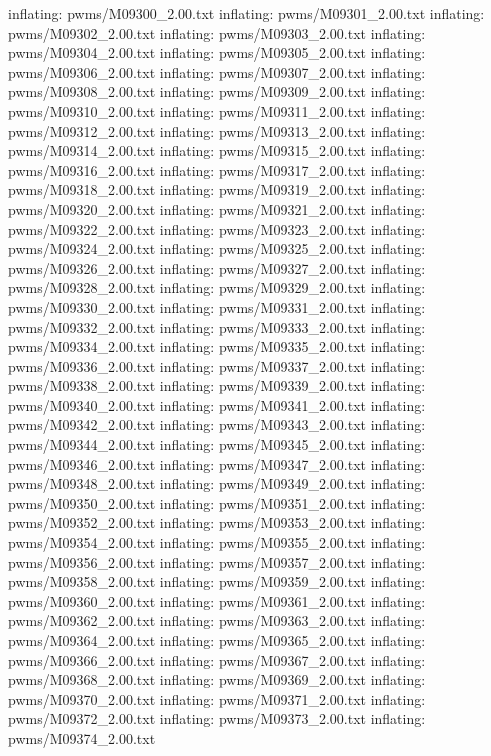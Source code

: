 \documentclass[letterpaper,10pt,english]{sphinxmanual}
\begin{document}
{\begin{sphinxVerbatim}[commandchars=\\\{\}]
  inflating: pwms/M09300\_2.00.txt
  inflating: pwms/M09301\_2.00.txt
  inflating: pwms/M09302\_2.00.txt
  inflating: pwms/M09303\_2.00.txt
  inflating: pwms/M09304\_2.00.txt
  inflating: pwms/M09305\_2.00.txt
  inflating: pwms/M09306\_2.00.txt
  inflating: pwms/M09307\_2.00.txt
  inflating: pwms/M09308\_2.00.txt
  inflating: pwms/M09309\_2.00.txt
  inflating: pwms/M09310\_2.00.txt
  inflating: pwms/M09311\_2.00.txt
  inflating: pwms/M09312\_2.00.txt
  inflating: pwms/M09313\_2.00.txt
  inflating: pwms/M09314\_2.00.txt
  inflating: pwms/M09315\_2.00.txt
  inflating: pwms/M09316\_2.00.txt
  inflating: pwms/M09317\_2.00.txt
  inflating: pwms/M09318\_2.00.txt
  inflating: pwms/M09319\_2.00.txt
  inflating: pwms/M09320\_2.00.txt
  inflating: pwms/M09321\_2.00.txt
  inflating: pwms/M09322\_2.00.txt
  inflating: pwms/M09323\_2.00.txt
  inflating: pwms/M09324\_2.00.txt
  inflating: pwms/M09325\_2.00.txt
  inflating: pwms/M09326\_2.00.txt
  inflating: pwms/M09327\_2.00.txt
  inflating: pwms/M09328\_2.00.txt
  inflating: pwms/M09329\_2.00.txt
  inflating: pwms/M09330\_2.00.txt
  inflating: pwms/M09331\_2.00.txt
  inflating: pwms/M09332\_2.00.txt
  inflating: pwms/M09333\_2.00.txt
  inflating: pwms/M09334\_2.00.txt
  inflating: pwms/M09335\_2.00.txt
  inflating: pwms/M09336\_2.00.txt
  inflating: pwms/M09337\_2.00.txt
  inflating: pwms/M09338\_2.00.txt
  inflating: pwms/M09339\_2.00.txt
  inflating: pwms/M09340\_2.00.txt
  inflating: pwms/M09341\_2.00.txt
  inflating: pwms/M09342\_2.00.txt
  inflating: pwms/M09343\_2.00.txt
  inflating: pwms/M09344\_2.00.txt
  inflating: pwms/M09345\_2.00.txt
  inflating: pwms/M09346\_2.00.txt
  inflating: pwms/M09347\_2.00.txt
  inflating: pwms/M09348\_2.00.txt
  inflating: pwms/M09349\_2.00.txt
  inflating: pwms/M09350\_2.00.txt
  inflating: pwms/M09351\_2.00.txt
  inflating: pwms/M09352\_2.00.txt
  inflating: pwms/M09353\_2.00.txt
  inflating: pwms/M09354\_2.00.txt
  inflating: pwms/M09355\_2.00.txt
  inflating: pwms/M09356\_2.00.txt
  inflating: pwms/M09357\_2.00.txt
  inflating: pwms/M09358\_2.00.txt
  inflating: pwms/M09359\_2.00.txt
  inflating: pwms/M09360\_2.00.txt
  inflating: pwms/M09361\_2.00.txt
  inflating: pwms/M09362\_2.00.txt
  inflating: pwms/M09363\_2.00.txt
  inflating: pwms/M09364\_2.00.txt
  inflating: pwms/M09365\_2.00.txt
  inflating: pwms/M09366\_2.00.txt
  inflating: pwms/M09367\_2.00.txt
  inflating: pwms/M09368\_2.00.txt
  inflating: pwms/M09369\_2.00.txt
  inflating: pwms/M09370\_2.00.txt
  inflating: pwms/M09371\_2.00.txt
  inflating: pwms/M09372\_2.00.txt
  inflating: pwms/M09373\_2.00.txt
  inflating: pwms/M09374\_2.00.txt

\end{sphinxVerbatim}}
\end{document}
